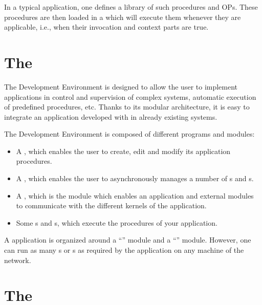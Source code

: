 In a typical \COPRS{} application, one defines a library of such procedures and
OPs. These procedures are then loaded in a \CPK{} which will execute them
whenever they are applicable, i.e., when their invocation and context parts are
true.

\section{The \COPRSDE{}}

The \COPRS{} Development Environment is designed to allow the user to implement
applications in control and supervision of complex systems, automatic execution
of predefined procedures, etc. Thanks to its modular architecture, it is easy
to integrate an application developed with \COPRS{} in already existing systems.


The \COPRS{} Development Environment is composed of different programs and
modules:

\begin{itemize}

\item A \OPE{}, which enables the user to create, edit and modify its
application procedures.

\item A \OPRSS{}, which enables the user to asynchronously manages a
number of \CPK{}s and \XPK{}s.

\item A \MPA{} , which is the module which enables an application and external
modules to communicate with the different kernels of the \COPRS{} application.

\item Some \CPK{}s and \XPK{}s, which execute the procedures of your
application.

\end{itemize}

A \COPRS{} application is organized around a ``\MPA{}'' module and a
``\OPRSS{}'' module.
However, one can run as many \CPK{}s or \XPK{}s as required by the application on any 
machine of the network.

\section{The \COPRSAE{}}


